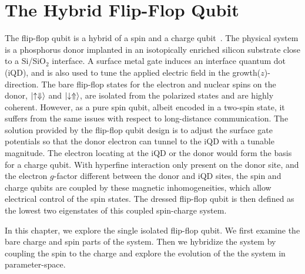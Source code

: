 \chapter{The Hybrid Flip-Flop Qubit}\label{CH:single}

The flip-flop qubit is a hybrid of a spin and a charge qubit~\cite{tosi_2017}.
The physical system is a phosphorus donor implanted in an isotopically enriched silicon substrate close to a Si/SiO$_2$ interface.
A surface metal gate induces an interface quantum dot (iQD), and is also used to tune the applied electric field in the growth($z$)-direction.
The bare flip-flop states for the electron and nuclear spins on the donor, $\ket{\uparrow\Downarrow}$ and $\ket{\downarrow\Uparrow}$, are isolated from the polarized states and are highly coherent.
However, as a pure spin qubit, albeit encoded in a two-spin state, it suffers from the same issues with respect to long-distance communication.
The solution provided by the flip-flop qubit design is to adjust the surface gate potentials so that the donor electron can tunnel to the iQD with a tunable magnitude.
The electron locating at the iQD or the donor would form the basis for a charge qubit.
With hyperfine interaction only present on the donor site, and the electron $g$-factor different between the donor and iQD sites, the spin and charge qubits are coupled by these magnetic inhomogeneities, which allow electrical control of the spin states.
The dressed flip-flop qubit is then defined as the lowest two eigenstates of this coupled spin-charge system.

In this chapter, we explore the single isolated flip-flop qubit.
We first examine the bare charge and spin parts of the system.
Then we hybridize the system by coupling the spin to the charge and explore the evolution of the the system in parameter-space.





